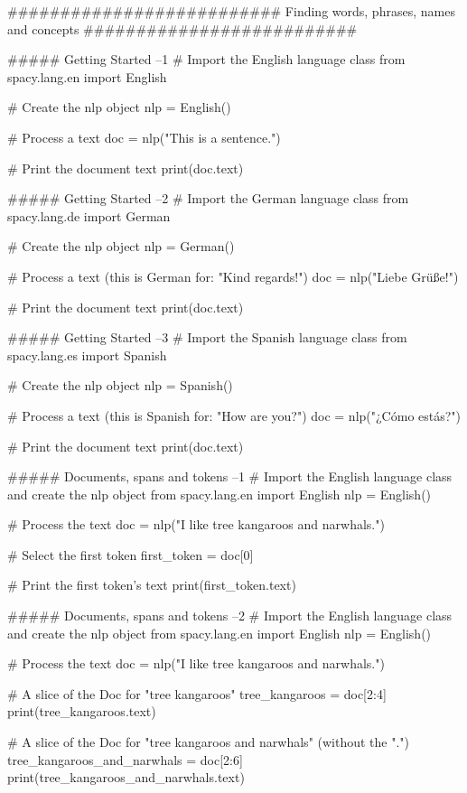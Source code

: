 ##########################  Finding words, phrases, names and concepts ##########################


##### Getting Started  --1
# Import the English language class
from spacy.lang.en import English

# Create the nlp object
nlp = English()

# Process a text
doc = nlp("This is a sentence.")

# Print the document text
print(doc.text)



##### Getting Started  --2
# Import the German language class
from spacy.lang.de import German

# Create the nlp object
nlp = German()

# Process a text (this is German for: "Kind regards!")
doc = nlp("Liebe Grüße!")

# Print the document text
print(doc.text)



##### Getting Started  --3
# Import the Spanish language class
from spacy.lang.es import Spanish

# Create the nlp object
nlp = Spanish()

# Process a text (this is Spanish for: "How are you?")
doc = nlp("¿Cómo estás?")

# Print the document text
print(doc.text)



##### Documents, spans and tokens --1
# Import the English language class and create the nlp object
from spacy.lang.en import English
nlp = English()

# Process the text
doc = nlp("I like tree kangaroos and narwhals.")

# Select the first token
first_token = doc[0]

# Print the first token's text
print(first_token.text)




##### Documents, spans and tokens --2
# Import the English language class and create the nlp object
from spacy.lang.en import English
nlp = English()

# Process the text
doc = nlp("I like tree kangaroos and narwhals.")

# A slice of the Doc for "tree kangaroos"
tree_kangaroos = doc[2:4]
print(tree_kangaroos.text)

# A slice of the Doc for "tree kangaroos and narwhals" (without the ".")
tree_kangaroos_and_narwhals = doc[2:6]
print(tree_kangaroos_and_narwhals.text)




